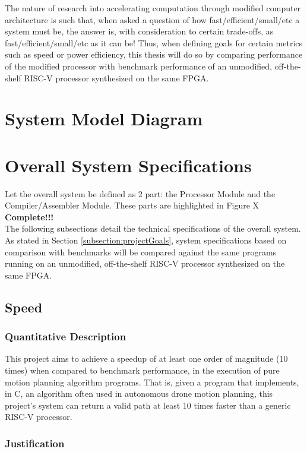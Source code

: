 \documentclass[11pt, oneside]{article}      %
\begin{document}
The nature of research into accelerating computation through modified computer architecture is such that, when asked a question of how fast/efficient/small/etc a system must be, the answer is, with consideration to certain trade-offs, as fast/efficient/small/etc as it can be! Thus, when defining goals for certain metrics such as speed or power efficiency, this thesis will do so by comparing performance of the modified processor with benchmark performance of an unmodified, off-the-shelf RISC-V processor synthesized on the same \ac{FPGA}.

\section{System Model Diagram}

\clearpage  


\section{Overall System Specifications}
Let the overall system be defined as 2 part: the Processor Module and the Compiler/Assembler Module. These parts are highlighted in Figure X \textbf{Complete!!!} \\
The following subsections detail the technical specifications of the overall system. As stated in Section \ref{subsection:projectGoals}, system specifications based on comparison with benchmarks will be compared against the same programs running on an unmodified, off-the-shelf RISC-V processor synthesized on the same \ac{FPGA}.
\subsection{Speed}
\subsubsection{Quantitative Description}
This project aims to achieve a speedup of at least one order of magnitude (10 times) when compared to benchmark performance, in the execution of pure motion planning algorithm programs. That is, given a program that implements, in C, an algorithm often used in autonomous drone motion planning, this project's system can return a valid path at least 10 times faster than a generic RISC-V processor. 

\subsubsection{Justification}
\end{document}
